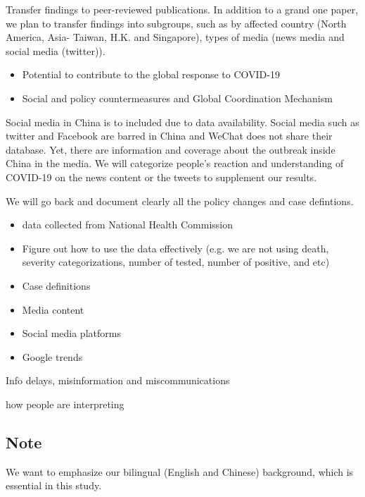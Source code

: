 





Transfer findings to peer-reviewed publications.  
In addition to a grand one paper, we plan to transfer findings into subgroups, such as by affected country (North America, Asia- Taiwan, H.K. and Singapore), types of media (news media and social media (twitter)).

\begin{itemize}
\item{Potential to contribute to the global response to COVID-19}
\item{Social and policy countermeasures and Global Coordination Mechanism}
\end{itemize}


Social media in China is to included due to data availability.   Social media such as twitter and Facebook are barred in China and WeChat does not share their database. Yet, there are information and coverage about the outbreak inside China in the media.  We will categorize people’s reaction and understanding of COVID-19  on the news content or the tweets to supplement our results.



We will go back and document clearly all the policy changes and case defintions. 

\begin{itemize}
\item{data collected from National Health Commission}
\item{Figure out how to use the data effectively (e.g. we are not using death, severity categorizations, number of tested, number of positive, and etc)}
\item{Case definitions}
\item{Media content}
\item{Social media platforms}
\item{Google trends}
\end{itemize}


Info delays, misinformation and miscommunications


how people are interpreting 


\subsection{Note}
We want to emphasize our bilingual (English and Chinese) background, which is essential in this study.



